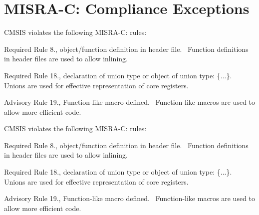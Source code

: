 \chapter{MISRA-\/C: Compliance Exceptions }
\hypertarget{CMSIS_MISRA_Exceptions}{}\label{CMSIS_MISRA_Exceptions}
CMSIS violates the following MISRA-\/C: rules:\+

\begin{DoxyItemize}
\item Required Rule 8., object/\+function definition in header file.~\newline
 Function definitions in header files are used to allow \textquotesingle{}inlining\textquotesingle{}.\end{DoxyItemize}
\begin{DoxyItemize}
\item Required Rule 18., declaration of union type or object of union type:\+ \textquotesingle{}\{...\}\textquotesingle{}.~\newline
 Unions are used for effective representation of core registers.\end{DoxyItemize}
\begin{DoxyItemize}
\item Advisory Rule 19., Function-\/like macro defined.~\newline
 Function-\/like macros are used to allow more efficient code.\end{DoxyItemize}


CMSIS violates the following MISRA-\/C: rules:\+

\begin{DoxyItemize}
\item Required Rule 8., object/\+function definition in header file.~\newline
 Function definitions in header files are used to allow \textquotesingle{}inlining\textquotesingle{}.\end{DoxyItemize}
\begin{DoxyItemize}
\item Required Rule 18., declaration of union type or object of union type:\+ \textquotesingle{}\{...\}\textquotesingle{}.~\newline
 Unions are used for effective representation of core registers.\end{DoxyItemize}
\begin{DoxyItemize}
\item Advisory Rule 19., Function-\/like macro defined.~\newline
 Function-\/like macros are used to allow more efficient code.\end{DoxyItemize}


